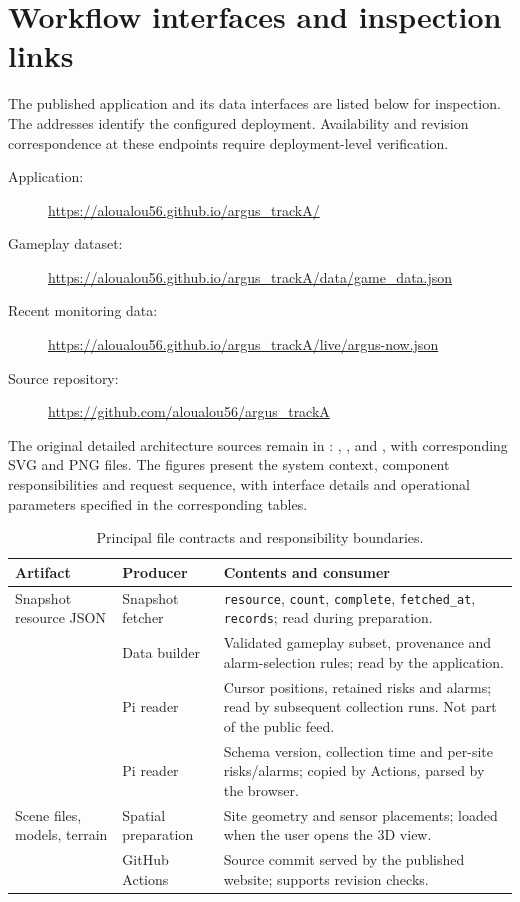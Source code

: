 \documentclass[10pt,a4paper]{article}
\begin{document}
\section{Workflow interfaces and inspection links}
The published application and its data interfaces are listed below for inspection. The addresses identify the configured deployment. Availability and revision correspondence at these endpoints require deployment-level verification.
\begin{description}
\item[Application:] \url{https://aloualou56.github.io/argus_trackA/}
\item[Gameplay dataset:] \url{https://aloualou56.github.io/argus_trackA/data/game_data.json}
\item[Recent monitoring data:] \url{https://aloualou56.github.io/argus_trackA/live/argus-now.json}
\item[Source repository:] \url{https://github.com/aloualou56/argus_trackA}
\end{description}
The original detailed architecture sources remain in : , , and , with corresponding SVG and PNG files. The figures present the system context, component responsibilities and request sequence, with interface details and operational parameters specified in the corresponding tables.

\begin{table}[htbp]
\centering\small
\caption{Principal file contracts and responsibility boundaries.}
\begin{tabularx}{\textwidth}{@{}p{}p{}Y@{}}
\toprule Artifact & Producer & Contents and consumer\\\midrule
Snapshot resource JSON & Snapshot fetcher & \texttt{resource}, \texttt{count}, \texttt{complete}, \texttt{fetched\_at}, \texttt{records}; read during preparation.\\
 & Data builder & Validated gameplay subset, provenance and alarm-selection rules; read by the application.\\
 & Pi reader & Cursor positions, retained risks and alarms; read by subsequent collection runs. Not part of the public feed.\\
 & Pi reader & Schema version, collection time and per-site risks/alarms; copied by Actions, parsed by the browser.\\
Scene files, models, terrain & Spatial preparation & Site geometry and sensor placements; loaded when the user opens the 3D view.\\
 & GitHub Actions & Source commit served by the published website; supports revision checks.\\
\bottomrule
\end{tabularx}
\end{table}
\end{document}
